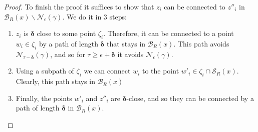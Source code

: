 \documentclass{amsart}
\numberwithin{equation}{section}
\theoremstyle{definition}
\newcommand{\calB}{\mathcal{B}}
\newcommand{\calN}{\mathcal{N}}
\newcommand{\calS}{\mathcal{S}}
\newcommand{\bdelta}{{\boldsymbol\delta}}
\newcommand{\ssm}{\smallsetminus}
\begin{document}
\begin{proof}
To finish the proof it suffices to show that $z_i$ can be connected to $z''_i$ in $\calB_R(x) \ssm \calN_\epsilon(\gamma)$.
We do it in 3 steps:
\begin{enumerate}
    \item $z_i$ is $\bdelta$ close to some point $\zeta_i$.
    Therefore, it can be connected to a point $w_i\in \zeta_i$ by a path of length $\bdelta$ that stays in $\calB_R(x)$.
    This path avoids $\calN_{\tau-\bdelta}(\gamma)$, and so for $\tau\ge \epsilon+\bdelta$ it avoids $\calN_{\epsilon}(\gamma)$.
    \item Using a subpath of $\zeta_i$ we can connect $w_i$ to the point $w'_i \in \zeta_i \cap \calS_R(x)$.
    Clearly, this path stays in $\calB_R(x)$
    \item Finally, the points $w'_i$ and $z''_i$ are $\bdelta$-close, and so they can be connected by a path of length $\bdelta$ in $\calB_R(x).$ \qedhere
\end{enumerate} 
\end{proof}
\end{document}
